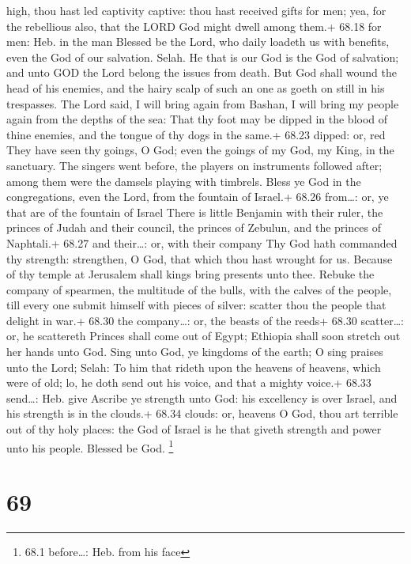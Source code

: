 high, thou hast led captivity captive: thou hast received gifts for men;
yea, for the rebellious also, that the LORD God might dwell among them.+
68.18 for men: Heb. in the man  Blessed be the Lord, who
daily loadeth us with benefits, even the God of our salvation. Selah.
 He that is our God is the God of salvation; and unto GOD
the Lord belong the issues from death.  But God shall wound
the head of his enemies, and the hairy scalp of such an one as goeth on
still in his trespasses.  The Lord said, I will bring again
from Bashan, I will bring my people again from the depths of the sea:
 That thy foot may be dipped in the blood of thine enemies,
and the tongue of thy dogs in the same.+ 68.23 dipped: or, red
 They have seen thy goings, O God; even the goings of my
God, my King, in the sanctuary.  The singers went before,
the players on instruments followed after; among them were the damsels
playing with timbrels.  Bless ye God in the congregations,
even the Lord, from the fountain of Israel.+ 68.26 from\ldots: or, ye
that are of the fountain of Israel  There is little
Benjamin with their ruler, the princes of Judah and their council, the
princes of Zebulun, and the princes of Naphtali.+ 68.27 and their\ldots:
or, with their company  Thy God hath commanded thy
strength: strengthen, O God, that which thou hast wrought for us.
 Because of thy temple at Jerusalem shall kings bring
presents unto thee.  Rebuke the company of spearmen, the
multitude of the bulls, with the calves of the people, till every one
submit himself with pieces of silver: scatter thou the people that
delight in war.+ 68.30 the company\ldots: or, the beasts of the reeds+
68.30 scatter\ldots: or, he scattereth  Princes shall come
out of Egypt; Ethiopia shall soon stretch out her hands unto God.
 Sing unto God, ye kingdoms of the earth; O sing praises
unto the Lord; Selah:  To him that rideth upon the heavens
of heavens, which were of old; lo, he doth send out his voice, and that
a mighty voice.+ 68.33 send\ldots: Heb. give  Ascribe ye
strength unto God: his excellency is over Israel, and his strength is in
the clouds.+ 68.34 clouds: or, heavens  O God, thou art
terrible out of thy holy places: the God of Israel is he that giveth
strength and power unto his people. Blessed be God. \footnote{68.1
  before\ldots: Heb. from his face}

\hypertarget{section-68}{%
\section{69}\label{section-68}}

